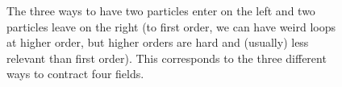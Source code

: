 \documentclass[fleqn]{NotesClass}
\begin{document}
    \begin{figure}
        \caption{The three ways to have two particles enter on the left and two particles leave on the right (to first order, we can have weird loops at higher order, but higher orders are hard and (usually) less relevant than first order). This corresponds to the three different ways to contract four fields.}
        \label{fig:swapping bosons}
    \end{figure}
    
\end{document}
